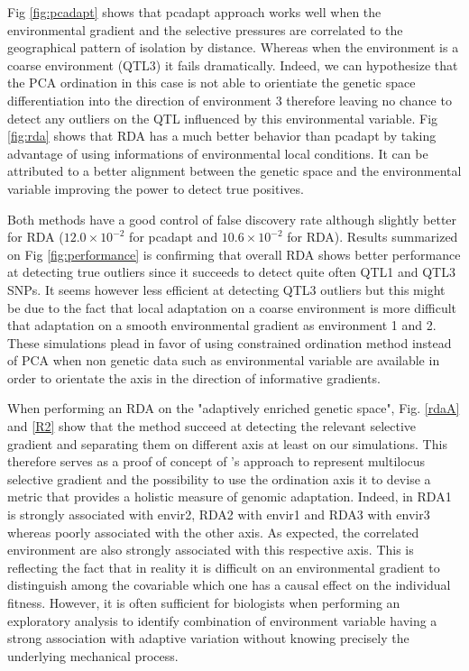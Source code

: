 \documentclass[nogrid]{MBE}%
\begin{document}
Fig \ref{fig:pcadapt} shows that pcadapt approach works well when the environmental gradient and the selective pressures are correlated to the  geographical pattern of isolation by distance. Whereas when the environment is a coarse environment (QTL3) it fails dramatically. Indeed, we can hypothesize that the PCA ordination in this case is not able to orientiate the genetic space differentiation into the direction of environment 3 therefore leaving no chance to detect any outliers on the QTL influenced by this environmental variable. Fig \ref{fig:rda} shows that RDA has a much better behavior than pcadapt by taking advantage of using informations of environmental local conditions. It can be attributed to a better alignment between the genetic space and the environmental variable improving the power to detect true positives.

Both methods have a good control of false discovery rate although slightly better for RDA ($12.0 \times 10^{-2}$ for pcadapt and $10.6 \times 10^{-2}$ for RDA). Results summarized on Fig \ref{fig:performance} is confirming that overall RDA shows better performance at detecting true outliers since it succeeds to detect quite often QTL1 and QTL3 SNPs. It seems however less efficient at detecting QTL3 outliers but this might be due to the fact that local adaptation on a coarse environment is more difficult  that adaptation on a smooth environmental gradient as environment 1 and 2. These simulations plead in favor of using constrained ordination method instead of PCA when non genetic data such as environmental variable are available in order to orientate the axis in the direction of informative gradients.

When performing an RDA on the "adaptively enriched genetic space", Fig. \ref{rdaA} and \ref{R2} show that the method succeed at detecting the relevant selective gradient and separating them on different axis at least on our simulations. This therefore serves as a proof of concept of \citet{Steane2014a}'s approach to represent multilocus selective gradient and the possibility to use the ordination axis it to devise a metric that provides a holistic measure of genomic adaptation. Indeed, in RDA1 is strongly associated with envir2, RDA2 with envir1 and RDA3 with envir3 whereas poorly associated with the other axis. As expected, the correlated environment are also strongly associated with this respective axis. This is reflecting the fact that in reality it is difficult on an environmental gradient to distinguish  among the covariable which one has a causal effect on the individual fitness. However, it is often sufficient for biologists when performing an exploratory analysis to identify combination of environment variable having a strong association with adaptive variation without knowing precisely the underlying mechanical process.
\end{document}
